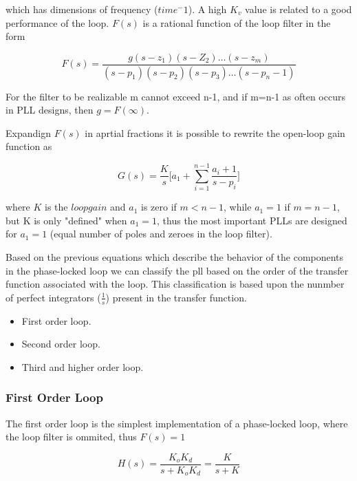 which has dimensions of frequency ($time^-1$). A high $K_v$ value is related to
a good performance of the loop. $F(s)$ is a rational function of the loop filter
in the form

\begin{equation}
    F(s)=\frac{g(s -z_1)(s-Z_2)\dots(s-z_m)}
    {(s-p_1)(s-p_2)(s-p_3)\dots(s-p_n-1)}
    \label{eq:filterrf}
\end{equation}

For the filter to be realizable m cannot exceed n-1, and if m=n-1 as often
occurs in PLL designs, then $g=F(\infty)$.

Expandign $F(s)$ in aprtial fractions it is possible to rewrite the open-loop
gain function as

\begin{equation}
    G(s)=\frac{K}{s}\Bigg[ a_1+\sum_{i=1}^{n-1} \frac{a_i+1}{s-p_i}\Bigg]
    \label{eq:gsfilter}
\end{equation}

where $K$ is the $loop gain$  and $a_1$ is zero if $m < n-1$, while $a_1 = 1$ 
if $m = n-1$, but K is only "defined" when $a_1 = 1$, thus the most important
PLLs are designed for $a_1 = 1$ (equal number of poles and zeroes in the loop
filter).

Based on the previous equations which describe the behavior of the components in the
phase-locked loop we can classify the pll based on the order of the transfer
function associated with the loop. This classification is based upon the nunmber
of perfect integrators ($\frac{1}{s}$) present in the transfer function.

\begin{itemize}
    \item First order loop.
    \item Second order loop.
    \item Third and higher order loop.
\end{itemize}

\subsubsection{First Order Loop}

The first order loop is the simplest implementation of a phase-locked loop,
where the loop filter is ommited, thus $F(s)=1$

\begin{equation}
    H(s)= \frac{K_oK_d}{s + K_oK_d}=
    \frac{K}{s + K}
    \label{eq:tf1st}
\end{equation}

